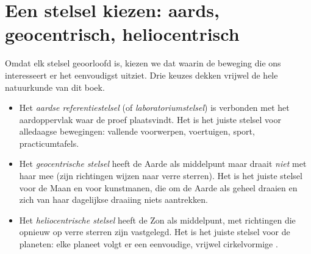 \section{Een stelsel kiezen: aards, geocentrisch, heliocentrisch}

Omdat elk stelsel geoorloofd is, kiezen we dat waarin de beweging die ons
interesseert er het eenvoudigst uitziet. Drie keuzes dekken vrijwel de
hele natuurkunde van dit boek.

\begin{definition}\label{def:g10:relative-motion:frames}
\begin{itemize}
  \item Het \emph{aardse referentiestelsel} (of
        \emph{laboratoriumstelsel}) is
        verbonden met het aardoppervlak waar de proef plaatsvindt. Het is
        het juiste stelsel voor alledaagse bewegingen: vallende
        voorwerpen, voertuigen, sport, practicumtafels.
  \item Het \emph{geocentrische stelsel}
        heeft de Aarde als middelpunt maar draait \emph{niet} met haar
        mee (zijn richtingen wijzen naar verre sterren). Het is het
        juiste stelsel voor de Maan en voor kunstmanen, die om de Aarde
        als geheel draaien en zich van haar dagelijkse draaiing niets
        aantrekken.
  \item Het \emph{heliocentrische stelsel}
        heeft de Zon als middelpunt, met richtingen die opnieuw op verre
        sterren zijn vastgelegd. Het is het juiste stelsel voor de
        planeten: elke planeet volgt er een eenvoudige, vrijwel
        cirkelvormige .
\end{itemize}
\end{definition}

